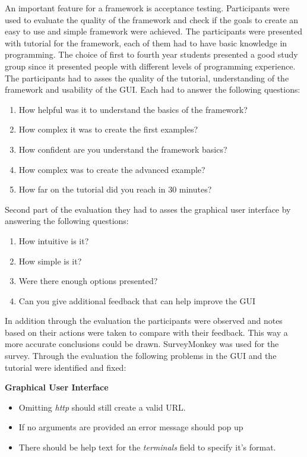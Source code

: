 An important feature for a framework is acceptance testing. Participants were used to evaluate the quality of the framework and check if the goals
to create an easy to use and simple framework were achieved. The participants were presented with tutorial for the framework, 
each of them had to have basic knowledge in programming. The choice of first to fourth year students presented a good study group since it presented people
with different levels of programming experience. The participants had to asses the quality of the 
tutorial, understanding of the framework and usability of the GUI. Each had to answer the following questions\cite{monkey}:

\begin{enumerate}
\item How helpful was it to understand the basics of the framework?
\item How complex it was to create the first examples?
\item How confident are you understand the framework basics? 
\item How complex was to create the advanced example?
\item How far on the tutorial did you reach in 30 minutes?
\end{enumerate}
 
Second part of the evaluation they had to asses the graphical user interface by answering the following questions: 

\begin{enumerate}
\item How intuitive is it?
\item How simple is it?
\item Were there enough options presented?
\item Can you give additional feedback that can help improve the GUI
\end{enumerate}

In addition through the evaluation the participants were observed and notes based on their actions were taken to compare with their feedback. This way a more
accurate conclusions could be drawn. SurveyMonkey was used for the survey. Through the evaluation the following problems in the GUI and the tutorial were identified and fixed:

\textbf{Graphical User Interface}
\begin{itemize}
\item Omitting \textit{http} should still create a valid URL.
\item If no arguments are provided an error message should pop up
\item There should be help text for the \textit{terminals} field to specify it's format.
\end{itemize}

